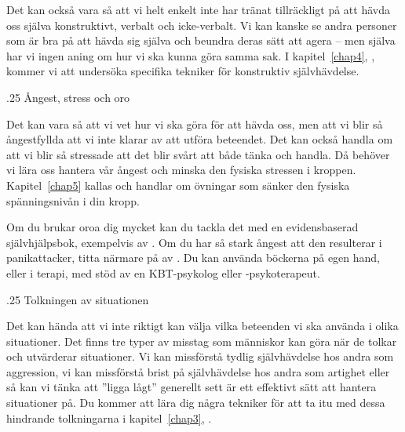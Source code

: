 \documentclass[swedish,a4paper]{book}
\makeatletter
\renewcommand\subsection{\@startsection{subsection}{1}{\z@}%
                                   {\baselineskip}%
                                   {.25\baselineskip}%
                                   {\fontsize{1\baselineskip}{1.25\baselineskip}\selectfont\sffamily\bfseries}} %
\makeatother
\begin{document}
Det kan också vara så att vi helt enkelt inte har tränat tillräckligt på
att hävda oss själva konstruktivt, verbalt och icke-verbalt. Vi kan kanske se
andra personer som är bra på att hävda sig själva och beundra deras
sätt att agera -- men själva har vi ingen aning om hur vi ska kunna göra samma sak. 
I kapitel~\ref{chap4}, \textit{}, kommer vi att undersöka specifika tekniker
för konstruktiv självhävdelse.

\subsection{Ångest, stress och oro}\label{uxe5ngest-stress-och-oro}

Det kan vara så att vi vet hur vi ska göra för att hävda oss, men att vi
blir så ångestfyllda att vi inte klarar av att utföra beteendet. Det kan
också handla om att vi blir så stressade att det blir svårt att både
tänka och handla. Då behöver vi lära oss hantera vår ångest och minska
den fysiska stressen i kroppen. Kapitel~\ref{chap5} kallas \textit{} och handlar om
övningar som sänker den fysiska spänningsnivån i din kropp.

Om du brukar oroa dig mycket kan du tackla det med en evidensbaserad
självhjälpsbok, exempelvis  av \textcite{dugas2018}. Om du har så stark ångest att den resulterar i panikattacker, titta närmare på  av \textcite{carlbring2013ingen}. Du kan använda böckerna på egen hand, eller i terapi, med stöd av en KBT-psykolog eller -psykoterapeut.

\subsection{Tolkningen av situationen}\label{tolkningen-av-situationen}

Det kan hända att vi inte riktigt kan välja vilka beteenden vi ska
använda i olika situationer. Det finns tre typer av misstag som
människor kan göra när de tolkar och utvärderar situationer. Vi kan
missförstå tydlig självhävdelse hos andra som aggression, vi kan missförstå brist
på självhävdelse hos andra som artighet eller så kan vi tänka att ''ligga lågt'' generellt sett är ett effektivt sätt att hantera situationer på. Du kommer att lära dig några tekniker för att ta itu med dessa hindrande tolkningarna i kapitel~\ref{chap3}, \textit{}.
\end{document}
